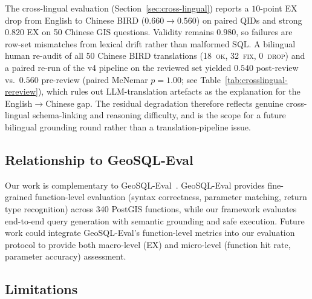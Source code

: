 \documentclass[11pt]{article}
\begin{document}
The cross-lingual evaluation (Section~\ref{sec:cross-lingual}) reports a $10$-point EX drop from English to Chinese BIRD ($0.660 \to 0.560$) on paired QIDs and strong $0.820$ EX on 50 Chinese GIS questions. Validity remains $0.980$, so failures are row-set mismatches from lexical drift rather than malformed SQL. A bilingual human re-audit of all 50 Chinese BIRD translations (18~\textsc{ok}, 32~\textsc{fix}, 0~\textsc{drop}) and a paired re-run of the v4 pipeline on the reviewed set yielded $0.540$ post-review vs.\ $0.560$ pre-review (paired McNemar $p=1.00$; see Table~\ref{tab:crosslingual-rereview}), which rules out LLM-translation artefacts as the explanation for the English$\to$Chinese gap. The residual degradation therefore reflects genuine cross-lingual schema-linking and reasoning difficulty, and is the scope for a future bilingual grounding round rather than a translation-pipeline issue.

\subsection{Relationship to GeoSQL-Eval}

Our work is complementary to GeoSQL-Eval~\cite{hou2026geosql}. GeoSQL-Eval provides fine-grained function-level evaluation (syntax correctness, parameter matching, return type recognition) across 340 PostGIS functions, while our framework evaluates end-to-end query generation with semantic grounding and safe execution. Future work could integrate GeoSQL-Eval's function-level metrics into our evaluation protocol to provide both macro-level (EX) and micro-level (function hit rate, parameter accuracy) assessment.

\subsection{Limitations}
\end{document}
